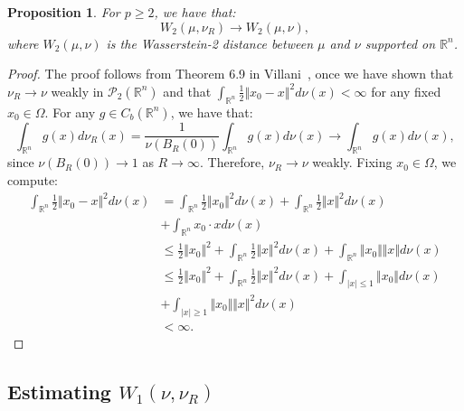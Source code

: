 \documentclass{amsart}
\theoremstyle{lemma}
\newtheorem{proposition}[theorem]{Proposition}
\theoremstyle{remark}
\begin{document}
\begin{proposition}
For $p \geq 2$, we have that:
\begin{equation}
W_2(\mu, \nu_{R}) \rightarrow W_2(\mu, \nu),
\end{equation}
where $W_2(\mu, \nu)$ is the Wasserstein-2 distance between $\mu$ and $\nu$ supported on $\mathbb{R}^n$.
\end{proposition}
\begin{proof}
The proof follows from Theorem 6.9 in Villani~\cite{villani2}, once we have shown that $\nu_{R} \rightarrow \nu$ weakly in $\mathcal{P}_{2}(\mathbb{R}^n)$ and that $\int_{\mathbb{R}^n} \frac{1}{2} \Vert x_0 - x \Vert^2 d\nu(x) <\infty$ for any fixed $x_0 \in \Omega$. For any $g \in C_{b}(\mathbb{R}^n)$, we have that:
\begin{equation}\label{eq:weakconv}
\int_{\mathbb{R}^n} g(x) d\nu_{R}(x) = \frac{1}{\nu(B_{R}(0))} \int_{\mathbb{R}^n} g(x) d\nu(x) \rightarrow \int_{\mathbb{R}^n} g(x) d\nu(x),
\end{equation}
since $\nu(B_{R}(0)) \rightarrow 1$ as $R \rightarrow \infty$. Therefore, $\nu_R \rightarrow \nu$ weakly. Fixing $x_0 \in \Omega$, we compute:
\begin{align}
\int_{\mathbb{R}^n} \frac{1}{2} \Vert x_0 - x \Vert^2 d\nu(x) &= \int_{\mathbb{R}^n} \frac{1}{2} \Vert x_0 \Vert^2 d\nu(x)  + \int_{\mathbb{R}^n} \frac{1}{2} \Vert x \Vert^2 d\nu(x)  \\
 &+ \int_{\mathbb{R}^n } x_0 \cdot x d\nu(x) \\
&\leq \frac{1}{2} \Vert x_0 \Vert^2 + \int_{\mathbb{R}^n} \frac{1}{2} \Vert x \Vert^2 d\nu(x) + \int_{\mathbb{R}^{n}} \Vert x_0 \Vert \Vert x \Vert d\nu(x) \\
&\leq \frac{1}{2} \Vert x_0 \Vert^2 + \int_{\mathbb{R}^n} \frac{1}{2} \Vert x \Vert^2 d\nu(x) + \int_{\vert x \vert \leq 1} \Vert x_0 \Vert d\nu(x) \\
&+ \int_{\vert x \vert \geq 1} \Vert x_0 \Vert \Vert x \Vert^2 d\nu(x) \\
&<\infty.
\end{align}
\end{proof}

\subsection{Estimating $W_{1}(\nu, \nu_{R})$}\label{sec:W1}
\end{document}
